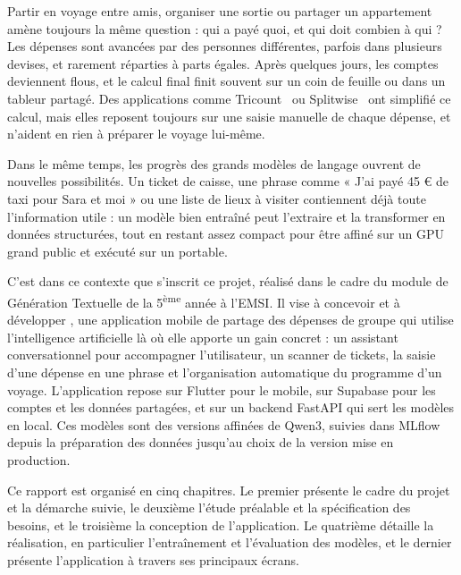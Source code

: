 
Partir en voyage entre amis, organiser une sortie ou partager un appartement amène
toujours la même question : qui a payé quoi, et qui doit combien à qui ? Les dépenses sont
avancées par des personnes différentes, parfois dans plusieurs devises, et rarement
réparties à parts égales. Après quelques jours, les comptes deviennent flous, et le calcul
final finit souvent sur un coin de feuille ou dans un tableur partagé. Des applications
comme Tricount~\cite{tricount} ou Splitwise~\cite{splitwise} ont simplifié ce calcul, mais elles reposent toujours sur une
saisie manuelle de chaque dépense, et n'aident en rien à préparer le voyage lui-même.

Dans le même temps, les progrès des grands modèles de langage ouvrent de nouvelles
possibilités. Un ticket de caisse, une phrase comme « J'ai payé 45 € de taxi pour Sara et
moi » ou une liste de lieux à visiter contiennent déjà toute l'information utile : un
modèle bien entraîné peut l'extraire et la transformer en données structurées, tout en
restant assez compact pour être affiné sur un GPU grand public et exécuté sur un portable.

C'est dans ce contexte que s'inscrit ce projet, réalisé dans le cadre du module de
Génération Textuelle de la 5\textsuperscript{ème} année à l'EMSI. Il vise à concevoir et à
développer \equipay, une application mobile de partage des dépenses de groupe qui utilise
l'intelligence artificielle là où elle apporte un gain concret : un assistant
conversationnel pour accompagner l'utilisateur, un scanner de tickets, la saisie d'une
dépense en une phrase et l'organisation automatique du programme d'un voyage. L'application
repose sur Flutter pour le mobile, sur Supabase pour les comptes et les données partagées,
et sur un backend FastAPI qui sert les modèles en local. Ces modèles sont des versions
affinées de Qwen3, suivies dans MLflow depuis la préparation des données jusqu'au choix de
la version mise en production.

Ce rapport est organisé en cinq chapitres. Le premier présente le cadre du projet et la
démarche suivie, le deuxième l'étude préalable et la spécification des besoins, et le
troisième la conception de l'application. Le quatrième détaille la réalisation, en
particulier l'entraînement et l'évaluation des modèles, et le dernier présente
l'application à travers ses principaux écrans.
